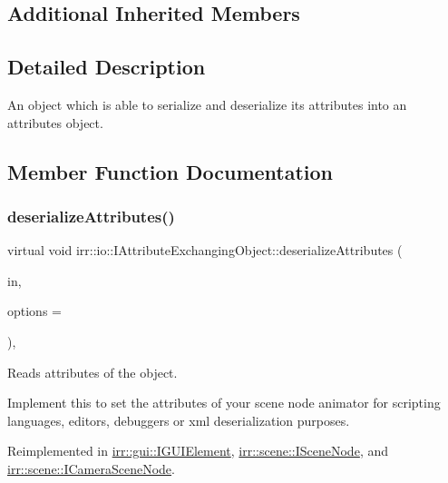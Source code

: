 \subsection*{Additional Inherited Members}


\subsection{Detailed Description}
An object which is able to serialize and deserialize its attributes into an attributes object. 

\subsection{Member Function Documentation}
\mbox{\label{classirr_1_1io_1_1IAttributeExchangingObject_a013d4ead3736d7fab4bc18c2d61a3e2e}} 
\subsubsection{\texorpdfstring{deserialize\+Attributes()}{deserializeAttributes()}}
{\footnotesize\ttfamily virtual void irr\+::io\+::\+I\+Attribute\+Exchanging\+Object\+::deserialize\+Attributes (\begin{DoxyParamCaption}\item[{\hyperlink{classirr_1_1io_1_1IAttributes}{io\+::\+I\+Attributes} $\ast$}]{in,  }\item[{\hyperlink{structirr_1_1io_1_1SAttributeReadWriteOptions}{io\+::\+S\+Attribute\+Read\+Write\+Options} $\ast$}]{options = {} }\end{DoxyParamCaption})\hspace{0.3cm}{\ttfamily [inline]}, {\ttfamily [virtual]}}



Reads attributes of the object. 

Implement this to set the attributes of your scene node animator for scripting languages, editors, debuggers or xml deserialization purposes. 

Reimplemented in \hyperlink{classirr_1_1gui_1_1IGUIElement_af71b96163b8d95816cd9c80fbf413b4d}{irr\+::gui\+::\+I\+G\+U\+I\+Element}, \hyperlink{classirr_1_1scene_1_1ISceneNode_a5fb609b08fc89a92f928c19ce3b181eb}{irr\+::scene\+::\+I\+Scene\+Node}, and \hyperlink{classirr_1_1scene_1_1ICameraSceneNode_a0df881cb5e2a55562399281061151ae8}{irr\+::scene\+::\+I\+Camera\+Scene\+Node}.


